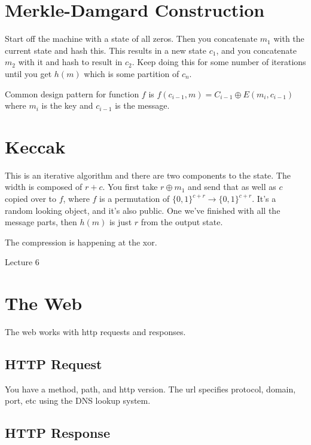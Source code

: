 \documentclass[psamsfonts]{amsart}
\begin{document}
\section{Merkle-Damgard Construction}

Start off the machine with a state of all zeros. Then you concatenate $m_1$ with the current state and hash this. This results in a new state $c_1$, and you concatenate $m_2$ with it and hash to result in $c_2$. Keep doing this for some number of iterations until you get $h(m)$ which is some partition of $c_n$.

Common design pattern for function $f$ is $f(c_{i-1}, m) = C_{i-1} \oplus E(m_i, c_{i-1})$ where $m_i$ is the key and $c_{i-1}$ is the message.

\section{Keccak}

This is an iterative algorithm and there are two components to the state. The width is composed of $r + c$. You first take $r \oplus m_1$ and send that as well as $c$ copied over to $f$, where $f$ is a permutation of $\{0,1\}^{c + r} \rightarrow \{0,1\}^{c + r}$. It's a random looking object, and it's also public. One we've finished with all the message parts, then $h(m)$ is just $r$ from the output state.

The compression is happening at the xor.


\newpage
\Large{Lecture 6}


\maketitle

\section{The Web}

The web works with http requests and responses.

\subsection{HTTP Request}

You have a method, path, and http version. The url specifies protocol, domain, port, etc using the DNS lookup system.

\subsection{HTTP Response}
\end{document}

